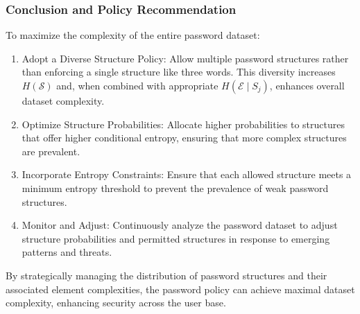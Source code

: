 \subsubsection{Conclusion and Policy Recommendation}

To maximize the complexity of the entire password dataset:
\begin{enumerate}
\item Adopt a Diverse Structure Policy: Allow multiple password structures rather than enforcing a single structure like three words. This diversity increases \( H(\mathcal{S}) \) and, when combined with appropriate \( H(\mathcal{E} \mid S_j) \), enhances overall dataset complexity.

\item Optimize Structure Probabilities: Allocate higher probabilities to structures that offer higher conditional entropy, ensuring that more complex structures are prevalent.

\item Incorporate Entropy Constraints: Ensure that each allowed structure meets a minimum entropy threshold to prevent the prevalence of weak password structures.

\item Monitor and Adjust: Continuously analyze the password dataset to adjust structure probabilities and permitted structures in response to emerging patterns and threats.
\end{enumerate}
By strategically managing the distribution of password structures and their associated element complexities, the password policy can achieve maximal dataset complexity, enhancing security across the user base.